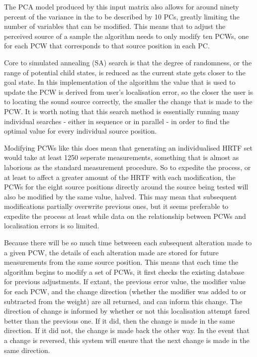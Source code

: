 The PCA model produced by this input matrix also allows for around ninety percent of the variance in the to be described by 10 PCs, greatly limiting the number of variables that can be modified. This means that to adjust the perceived source of a sample the algorithm needs to only modify ten PCWs, one for each PCW that corresponds to that source position in each PC. 

Core to simulated annealing (SA) search is that the degree of randomness, or the range of potential child states, is reduced as the current state gets closer to the goal state. In this implementation of the algorithm the value that is used to update the PCW is derived from user's localisation error, so the closer the user is to locating the sound source correctly, the smaller the change that is made to the PCW. It is worth noting that this search method is essentially running many individual searches - either in sequence or in parallel - in order to find the optimal value for every individual source position. 

Modifying PCWs like this does mean that generating an individualised HRTF set would take at least 1250 seperate measurements, something that is almost as laborious as the standard measurement procedure. So to expedite the process, or at least to affect a greater amount of the HRTF with each modification, the PCWs for the eight source positions directly around the source being tested will also be modified by the same value, halved. This may mean that subsequent modifications partially overwrite previous ones, but it seems preferable to expedite the process at least while data on the relationship between PCWs and localisation errors is so limited. 

Because there will be so much time betweeen each subsequent alteration made to a given PCW, the details of each alteration made are stored for future measurements from the same source position. This means that each time the algorithm begins to modify a set of PCWs, it first checks the existing database for previous adjustments. If extant, the previous error value, the modifier value for each PCW, and the change direction (whether the modifier was added to or subtracted from the weight) are all returned, and can inform this change. The direction of change is informed by whether or not this localisation attempt fared better than the previous one. If it did, then the change is made in the same direction. If it did not, the change is made back the other way. In the event that a change is reversed, this system will ensure that the next change is made in the same direction. 


